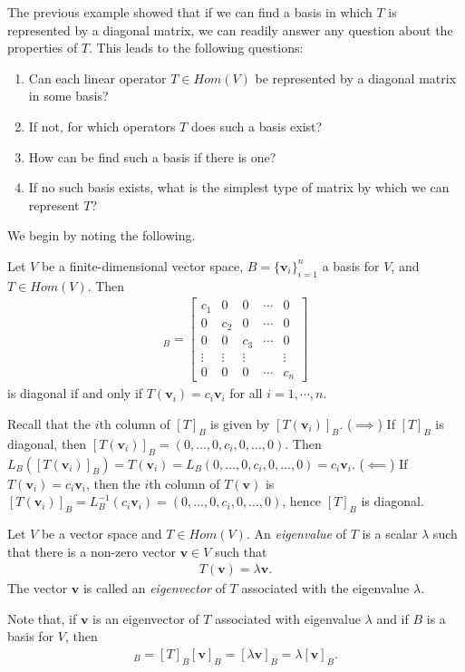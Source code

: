 \documentclass[12pt,letterpaper,reqno]{article}
\numberwithin{equation}{section}
\newcommand{\bv}{\mathbf{v}}
\begin{document}
The previous example showed that if we can find a basis in which $T$ is represented by a diagonal matrix, we can readily answer any question about the properties of $T$. This leads to the following questions:
\begin{enumerate}[(1)]
	\item Can each linear operator $T \in Hom(V)$ be represented by a diagonal matrix in some basis?
	\item If not, for which operators $T$ does such a basis exist?
	\item How can be find such a basis if there is one?
	\item If no such basis exists, what is the simplest type of matrix by which we can represent $T$?
\end{enumerate}
We begin by noting the following.
\begin{thm}\label{thm:diagonality_condition}
Let $V$ be a finite-dimensional vector space, $B=\{\bv_i\}_{i=1}^n$ a basis for $V$, and $T \in Hom(V)$. Then
\begin{align*}
	[T]_B=\begin{bmatrix}
		c_1 & 0 & 0 & \cdots & 0 \\
		0 & c_2 & 0 & \cdots & 0 \\
		0 & 0 & c_3 & \cdots & 0 \\
		\vdots & \vdots & \vdots
		 & & \vdots \\
		 0 & 0 & 0 & \cdots & c_n
	\end{bmatrix}
\end{align*}
is diagonal if and only if $T(\bv_i)=c_i\bv_i$ for all $i=1,\cdots,n$.	
\end{thm}

\begin{pf}
Recall that the $i$th column of $[T]_B$ is given by $[T(\bv_i)]_B$. ($\implies$) If $[T]_B$ is diagonal, then $[T(\bv_i)]_B=(0, \dots, 0, c_i,0,\dots,0)$. Then $L_B([T(\bv_i)]_B)=T(\bv_i)=L_B(0, \dots, 0, c_i,0,\dots,0)=c_i\bv_i$. ($\impliedby$) If $T(\bv_i)=c_i\bv_i$, then the $i$th column of $T(\bv)$ is $[T(\bv_i)]_B=L_B^{-1}(c_i\bv_i)=	(0, \dots, 0, c_i,0,\dots,0)$, hence $[T]_B$ is diagonal.
\end{pf}

\begin{defn}
Let $V$ be a vector space and $T \in Hom(V)$. An \emph{eigenvalue} of $T$ is a scalar $\lambda$ such that there is a non-zero vector $\bv \in V$ such that 
	\begin{align*}
		T(\bv)=\lambda\bv.
	\end{align*}
The vector $\bv$ is called an \emph{eigenvector} of $T$ associated with the eigenvalue $\lambda$. 
\end{defn}
Note that, if $\bv$ is an eigenvector of $T$ associated with eigenvalue $\lambda$ and if $B$ is a basis for $V$, then 
\begin{align*}
[T(\bv)]_B=[T]_B[\bv]_B=[\lambda\bv]_B=\lambda[\bv]_B.
\end{align*}
\end{document}
